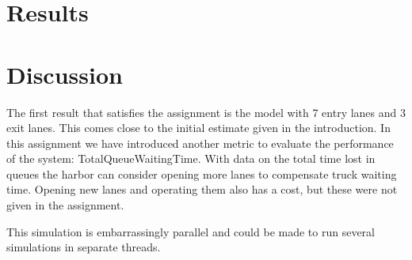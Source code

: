 \documentclass{article}
\begin{document}
\section{Results}


\section{Discussion}

The first result that satisfies the assignment is the model with 7
entry lanes and 3 exit lanes. This comes close to the initial estimate
given in the introduction. In this assignment we have introduced
another metric to evaluate the performance of the system:
TotalQueueWaitingTime. With data on the total time lost in queues the
harbor can consider opening more lanes to compensate truck waiting
time. Opening new lanes and operating them also has a cost, but these
were not given in the assignment.

This simulation is embarrassingly parallel and could be made to run
several simulations in separate threads.
\end{document}
